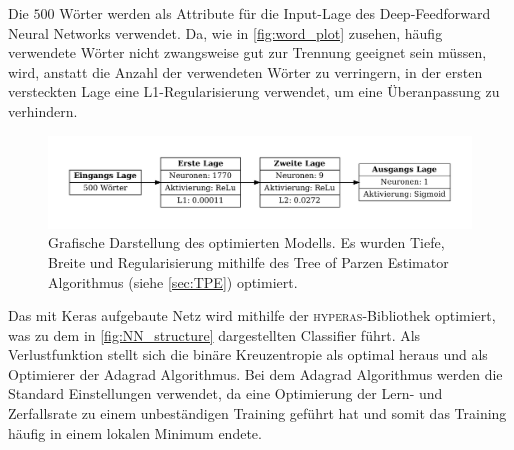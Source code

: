 Die $500$ Wörter werden als Attribute für die Input-Lage des Deep-Feedforward Neural Networks verwendet. 
Da, wie in \autoref{fig:word_plot} zusehen, häufig verwendete Wörter nicht zwangsweise gut zur Trennung geeignet 
sein müssen, wird, anstatt die Anzahl der verwendeten Wörter zu verringern, in der ersten versteckten Lage eine 
L1-Regularisierung verwendet, um eine Überanpassung zu verhindern.

\begin{figure}
    \centering
    \includegraphics[width=\textwidth]{pictures/modell_scheme.pdf}
    \caption{Grafische Darstellung des optimierten Modells. Es wurden Tiefe, Breite und Regularisierung mithilfe 
            des Tree of Parzen Estimator Algorithmus (siehe \autoref{sec:TPE}) optimiert.}
    \label{fig:NN_structure}
\end{figure}

Das mit Keras\cite{keras} aufgebaute Netz wird mithilfe der \textsc{hyperas}-Bibliothek\cite{hyperas} optimiert, was 
zu dem in \autoref{fig:NN_structure} dargestellten Classifier führt.
Als Verlustfunktion stellt sich die binäre Kreuzentropie als optimal heraus und als Optimierer der Adagrad Algorithmus.
Bei dem Adagrad Algorithmus werden die Standard Einstellungen verwendet, 
da eine Optimierung der Lern- und Zerfallsrate zu einem unbeständigen Training geführt hat und somit das Training häufig 
in einem lokalen Minimum endete.


